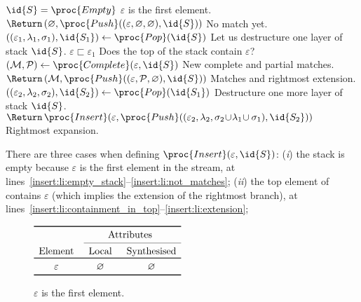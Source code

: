 \begin{codebox}
\li	\If \(\id{S} = \proc{Empty}\) \label{insert:li:empty_stack}
\RComment \(\varepsilon\) is the first element.
\li	\Then \(\Return \, (\varnothing, \proc{Push} ((\varepsilon, \varnothing,
                        \varnothing), \id{S}))\)
          \label{insert:li:not_matches}
\RComment No match yet.
	\End
\li \(((\varepsilon_1, \lambda_1, \sigma_1), \id{S_1}) 
      \gets \proc{Pop}(\id{S})\) 
    \label{insert:li:first_pop}
\RComment Let us destructure one layer of stack \(\id{S}\). 
\li	\If \(\varepsilon \sqsubset \varepsilon_1\)
    \label{insert:li:containment_in_top}
\RComment Does the top of the stack contain \(\varepsilon\)?
\li	\Then \(({\cal M}, {\cal P}) \gets \proc{Complete} (\varepsilon, \id{S})\)
    \label{insert:li:complete_stack}
\RComment New complete and partial matches.
\li \(\Return \, ({\cal M}, \proc{Push} ((\varepsilon, {\cal P},
                                          \varnothing), 
                                         \id{S}))\)
    \label{insert:li:extension}
\RComment Matches and rightmost extension.
    \End
\li  \(((\varepsilon_2, \lambda_2, \sigma_2), \id{S_2}) 
       \gets \proc{Pop} (\id{S_1})\)
     \label{insert:li:second_pop}
\RComment Destructure one more layer of stack \(\id{S}\).
\li  \(\Return \, \proc{Insert} (\varepsilon, 
                                 \proc{Push} ((\varepsilon_2,
                                               \lambda_2,
                                               \sigma_2\!\cup\!
                                               \lambda_1 \!\cup \sigma_1),
                                              \id{S_2}))\)
     \label{insert:li:expansion}
\RComment Rightmost expansion.
\end{codebox}
\noindent There are three cases when defining \(\proc{Insert}
(\varepsilon, \id{S})\): (\emph{i}) the stack  is empty because
\(\varepsilon\) is the first element in the stream, at
lines~\ref{insert:li:empty_stack}--\ref{insert:li:not_matches};
(\emph{ii}) the top element of  contains \(\varepsilon\) (which
implies the extension of the rightmost branch), at
lines~\ref{insert:li:containment_in_top}--\ref{insert:li:extension};
\begin{wrapfigure}[7]{r}{0pt}
\centering
\(
\begin{array}{c>{\hspace*{5pt}}c>{\hspace*{5pt}}c}
\toprule
& \multicolumn{2}{c}{\text{Attributes}}\\
\cmidrule(l){2-3}
\text{Element} & \text{Local} & \text{Synthesised}\\
\toprule
\varepsilon & \varnothing & \varnothing\\
\bottomrule
\end{array}
\)
\caption{\(\varepsilon\) is the first element.}
\label{first_elem}
\end{wrapfigure}
